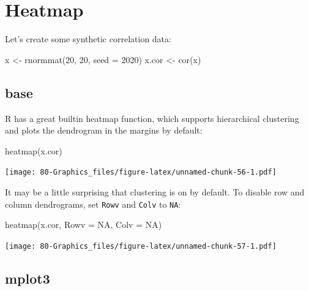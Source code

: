 \documentclass[
]{book}
\newenvironment{Shaded}{\begin{snugshade}}{\end{snugshade}}
\newcommand{\AttributeTok}[1]{\textcolor[rgb]{0.77,0.63,0.00}{#1}}
\newcommand{\ConstantTok}[1]{\textcolor[rgb]{0.00,0.00,0.00}{#1}}
\newcommand{\DecValTok}[1]{\textcolor[rgb]{0.00,0.00,0.81}{#1}}
\newcommand{\FunctionTok}[1]{\textcolor[rgb]{0.00,0.00,0.00}{#1}}
\newcommand{\NormalTok}[1]{#1}
\newcommand{\OtherTok}[1]{\textcolor[rgb]{0.56,0.35,0.01}{#1}}
\begin{document}
\hypertarget{heatmap}{%
\section{Heatmap}\label{heatmap}}

Let's create some synthetic correlation data:

\begin{Shaded}
\begin{Highlighting}[]
\NormalTok{x }\OtherTok{\textless{}{-}} \FunctionTok{rnormmat}\NormalTok{(}\DecValTok{20}\NormalTok{, }\DecValTok{20}\NormalTok{, }\AttributeTok{seed =} \DecValTok{2020}\NormalTok{)}
\NormalTok{x.cor }\OtherTok{\textless{}{-}} \FunctionTok{cor}\NormalTok{(x)}
\end{Highlighting}
\end{Shaded}

\hypertarget{base-7}{%
\subsection{base}\label{base-7}}

R has a great builtin heatmap function, which supports hierarchical clustering and plots the dendrogram in the margins by default:

\begin{Shaded}
\begin{Highlighting}[]
\FunctionTok{heatmap}\NormalTok{(x.cor)}
\end{Highlighting}
\end{Shaded}

\texttt{[image: 80-Graphics\_files/figure-latex/unnamed-chunk-56-1.pdf]}

It may be a little surprising that clustering is on by default. To disable row and column dendrograms, set \texttt{Rowv} and \texttt{Colv} to \texttt{NA}:

\begin{Shaded}
\begin{Highlighting}[]
\FunctionTok{heatmap}\NormalTok{(x.cor, }\AttributeTok{Rowv =} \ConstantTok{NA}\NormalTok{, }\AttributeTok{Colv =} \ConstantTok{NA}\NormalTok{)}
\end{Highlighting}
\end{Shaded}

\texttt{[image: 80-Graphics\_files/figure-latex/unnamed-chunk-57-1.pdf]}

\hypertarget{mplot3-6}{%
\subsection{\texorpdfstring{\textbf{mplot3}}{mplot3}}\label{mplot3-6}}
\end{document}
